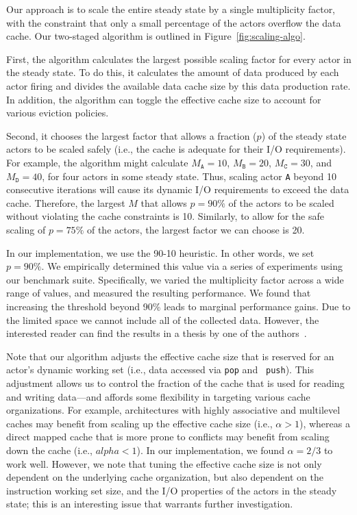 Our approach is to scale the entire steady state by a single
multiplicity factor, with the constraint that only a small percentage
of the actors overflow the data cache. Our two-staged algorithm is
outlined in Figure~\ref{fig:scaling-algo}.

First, the algorithm calculates the largest possible scaling factor
for every actor in the steady state. To do this, it calculates the
amount of data produced by each actor firing and divides the available
data cache size by this data production rate. In addition, the
algorithm can toggle the effective cache size to account for various
eviction policies.

Second, it chooses the largest
factor that allows a fraction ($p$) of the steady state actors to be
scaled safely (i.e., the cache is adequate for their I/O
requirements).  For example, the algorithm might calculate
$M_\texttt{A} = 10$,
$M_\texttt{B} = 20$, 
$M_\texttt{C} = 30$, and 
$M_\texttt{D} = 40$, for four actors in some steady state. Thus,
scaling actor \texttt{A} beyond 10 consecutive iterations will cause
its dynamic I/O requirements to exceed the data cache. Therefore, the
largest $M$ that allows $p=90\%$ of the actors to be
scaled without violating the cache constraints is 10.
Similarly, to allow for the safe scaling of $p=75\%$ of the actors, the
largest factor we can choose is 20.

In our implementation, we use the 90-10 heuristic. In other words, we
set $p=90\%$. We empirically determined this value via a series of
experiments using our benchmark suite. Specifically, we varied the
multiplicity factor across a wide range of values,
and measured the resulting performance. We found that
increasing the threshold beyond 90\% leads to marginal
performance gains. Due to the limited space we cannot include all of
the collected data. However, the interested reader can find
the results in a thesis by one of the authors~\cite{janis-thesis}.


Note that our algorithm adjusts the effective cache size that is
reserved for an actor's 
dynamic working set (i.e., data accessed via {\tt pop} and {\tt
push}). This adjustment allows us to control the fraction of the cache
that is used for reading and writing data---and affords some
flexibility in targeting various cache organizations.  For example,
architectures with highly associative and multilevel caches may benefit
from scaling up the effective cache size (i.e., $\alpha > 1$), whereas
a direct mapped cache that is more prone to conflicts may benefit from
scaling down the cache (i.e., $alpha < 1$). In our implementation, we
found $\alpha=2/3$ to work well. However, we note that tuning the
effective cache size is not only dependent on the underlying cache
organization, but also dependent on the instruction  working
set size, and the  I/O properties of the actors in the steady
state; this is an interesting issue that warrants further
investigation.
